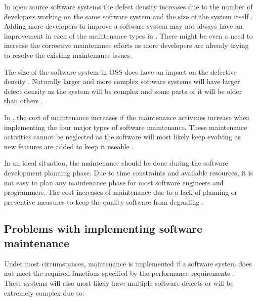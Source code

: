 In open source software systems the defect density increases due to the number of developers working on the same software system and the size of the system itself \cite{Rahmani2010}. Adding more developers to improve a software system may not always have an improvement in each of the maintenance types in . There might be even a need to increase the corrective maintenance efforts as more developers are already trying to resolve the existing maintenance issues.\par The size of the software system in OSS does have an impact on the defective density \cite{Rahmani2010}. Naturally larger and more complex software systems will have larger defect density as the system will be complex and some parts of it will be older than others \cite{SourceForged2009}. 

In , the cost of maintenance increases if the maintenance activities increase when implementing the four major types of software maintenance. These maintenance activities cannot be neglected as the software will most likely keep evolving as new features are added to keep it useable \cite{Alenezi2016}. \par In an ideal situation, the maintenance should be done during the software development planning phase. Due to time constraints and available resources, it is not easy to plan any maintenance phase for most software engineers and programmers. The cost increases of maintenance due to a lack of planning or preventive measures to keep the quality software from degrading \cite{Alenezi2016}.

\subsection{Problems with implementing software maintenance}\label{sec:Maintenance_problems}

Under most circumstances, maintenance is implemented if a software system does not meet the required functions specified by the performance requirements \cite{Ogheneovo2014, Sneed2004}. These systems will also most likely have multiple software defects or will be extremely complex due to:

